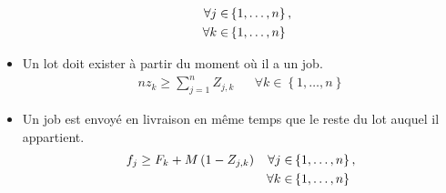 \begin{itemize}
\begin{align}
		                                                 &  & \forall j \in & \left\{1,\dotsc, n \right\}, \notag \\
		                                                 &  & \forall k \in & \left\{1,\dotsc, n \right\}
	      \end{align}
	\item
	      Un lot doit exister à partir du moment où il a un job.
	      \begin{align}
		      n z_k\geq\sum_{j=1}^{n}Z_{j,k} &  &
		      \forall k \in\left\{1,\dotsc,n \right\}
	      \end{align}
	\item
	      Un job est envoyé en livraison en même temps que le reste du lot auquel il appartient.
	      \begin{align}
		      f_j \geq F_k + M \left(1 - Z_{j,k} \right) &  & \forall j \in & \left\{ 1,\dotsc,n \right\},\notag \\
		                                                 &  & \forall k \in & \left\{ 1,\dotsc,n\right\}
	      \end{align}


\end{itemize}
